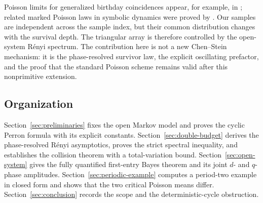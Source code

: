 Poisson limits for generalized birthday coincidences appear, for
example, in \citet{Henze1998}; related marked Poisson laws in symbolic
dynamics were proved by \citet{ChazottesCoelhoCollet2009}.  Our samples
are independent across the sample index, but their common distribution
changes with the survival depth.  The triangular array is therefore
controlled by the open-system R\'enyi spectrum.  The contribution here
is not a new Chen--Stein mechanism: it is the phase-resolved survivor
law, the explicit oscillating prefactor, and the proof that the standard
Poisson scheme remains valid after this nonprimitive extension.

\subsection*{Organization}

Section~\ref{sec:preliminaries} fixes the open Markov model and proves
the cyclic Perron formula with its explicit constants.
Section~\ref{sec:double-budget} derives the phase-resolved R\'enyi
asymptotics, proves the strict spectral inequality, and establishes the
collision theorem with a total-variation bound.
Section~\ref{sec:open-system} gives the fully quantified first-entry
Bayes theorem and its joint \(d\)- and \(q\)-phase amplitudes.
Section~\ref{sec:periodic-example} computes a period-two example in
closed form and shows that the two critical Poisson means differ.
Section~\ref{sec:conclusion} records the scope and the deterministic-cycle
obstruction.
